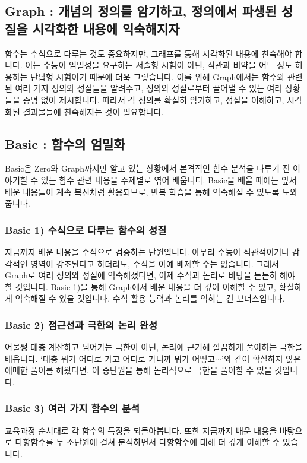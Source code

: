 \subsection{Graph : 개념의 정의를 암기하고, 정의에서 파생된 성질을 시각화한 내용에 익숙해지자}
함수는 수식으로 다루는 것도 중요하지만, 그래프를 통해 시각화된 내용에 친숙해야 합니다. 이는 수능이 엄밀성을 요구하는 서술형 시험이 아닌, 직관과 비약을 어느 정도 허용하는 단답형 시험이기 때문에 더욱 그렇습니다. 이를 위해 Graph에서는 함수와 관련된 여러 가지 정의와 성질들을 알려주고, 정의와 성질로부터 끌어낼 수 있는 여러 상황들을 증명 없이 제시합니다. 따라서 각 정의를 확실히 암기하고, 성질을 이해하고, 시각화된 결과물들에 친숙해지는 것이 필요합니다. \clearpage

\subsection{Basic : 함수의 엄밀화}
Basic은 Zero와 Graph까지만 알고 있는 상황에서 본격적인 함수 분석을 다루기 전 이야기할 수 있는 함수 관련 내용을 주제별로 엮어 배웁니다. Basic을 배울 때에는 앞서 배운 내용들이 계속 복선처럼 활용되므로, 반복 학습을 통해 익숙해질 수 있도록 도와줍니다.

\subsubsection{Basic 1) 수식으로 다루는 함수의 성질}
지금까지 배운 내용을 수식으로 검증하는 단원입니다. 아무리 수능이 직관적이거나 감각적인 영역이 강조된다고 하더라도, 수식을 아예 배제할 수는 없습니다. 그래서 Graph로 여러 정의와 성질에 익숙해졌다면, 이제 수식과 논리로 바탕을 든든히 해야 할 것입니다. Basic 1)을 통해 Graph에서 배운 내용을 더 깊이 이해할 수 있고, 확실하게 익숙해질 수 있을 것입니다. 수식 활용 능력과 논리를 익히는 건 보너스입니다.


\subsubsection{Basic 2) 점근선과 극한의 논리 완성}
어물쩡 대충 계산하고 넘어가는 극한이 아닌, 논리에 근거해 깔끔하게 풀이하는 극한을 배웁니다. `대충 뭐가 어디로 가고 어디로 가니까 뭐가 어떻고$\cdots$'와 같이 확실하지 않은 애매한 풀이를 해왔다면, 이 중단원을 통해 논리적으로 극한을 풀이할 수 있을 것입니다.

\subsubsection{Basic 3) 여러 가지 함수의 분석}
교육과정 순서대로 각 함수의 특징을 되돌아봅니다. 또한 지금까지 배운 내용을 바탕으로 다항함수를 두 소단원에 걸쳐 분석하면서 다항함수에 대해 더 깊게 이해할 수 있습니다.


